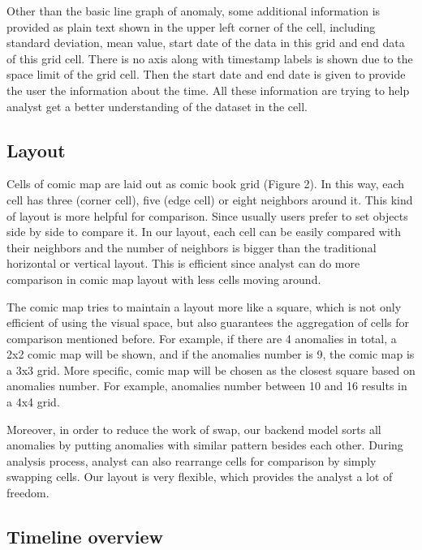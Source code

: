 \documentclass{vgtc}                          %
\begin{document}
Other than the basic line graph of anomaly, some additional information is provided as plain text shown in the upper left corner of the cell, including standard deviation, mean value, start date of the data in this grid and end data of this grid cell. There is no axis along with timestamp labels is shown due to the space limit of the grid cell. Then the start date and end date is given to provide the user the information about the time. All these information are trying to help analyst get a better understanding of the dataset in the cell.
\subsection{Layout}
Cells of comic map are laid out as comic book grid (Figure 2). In this way, each cell has three (corner cell), five (edge cell) or eight neighbors around it. This kind of layout is more helpful for comparison. Since usually users prefer to set objects side by side to compare it. In our layout, each cell can be easily compared with their neighbors and the number of neighbors is bigger than the traditional horizontal or vertical layout. This is efficient since analyst can do more comparison in comic map layout with less cells moving around.

The comic map tries to maintain a layout more like a square, which is not only efficient of using the visual space, but also guarantees the aggregation of cells for comparison mentioned before. For example, if there are 4 anomalies in total, a 2x2 comic map will be shown, and if the anomalies number is 9, the comic map is a 3x3 grid. More specific, comic map will be chosen as the closest square based on anomalies number. For example, anomalies number between 10 and 16 results in a 4x4 grid.

Moreover, in order to reduce the work of swap, our backend model sorts all anomalies by putting anomalies with similar pattern besides each other. During analysis process, analyst can also rearrange cells for comparison by simply swapping cells. Our layout is very flexible, which provides the analyst a lot of freedom.

\subsection{Timeline overview}
\end{document}
